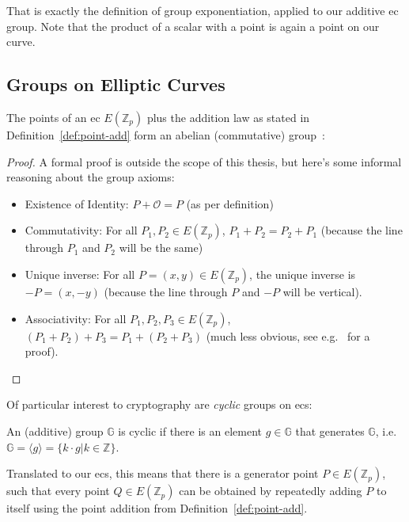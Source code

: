 That is exactly the definition of group exponentiation, applied to our additive \gls{ec} group. Note that the product of a scalar with a point is again a point on our curve.\\

\subsection{Groups on Elliptic Curves}
\begin{theorem}
    The points of an \gls{ec} $E(\mathbb{Z}_p)$ plus the addition law as stated in Definition~\ref{def:point-add} form an abelian (commutative) group~\cite{katz_introduction_2015, washington_elliptic_2008}:
\end{theorem}
\begin{proof}
    A formal proof is outside the scope of this thesis, but here's some informal reasoning about the group axioms:
    \begin{itemize}
        \item Existence of Identity: $P + \mathcal{O} = P$ (as per definition)
        \item Commutativity: For all $P_1, P_2 \in E(\mathbb{Z}_p)$, $P_1 + P_2 = P_2 + P_1$ (because the line through $P_1$ and $P_2$ will be the same)
        \item Unique inverse: For all $P = (x,y) \in E(\mathbb{Z}_p)$, the unique inverse is $-P = (x, -y)$ (because the line through $P$ and $-P$ will be vertical).
        \item Associativity: For all $P_1, P_2, P_3 \in E(\mathbb{Z}_p)$, $(P_1 + P_2) + P_3 = P_1 + (P_2 + P_3)$ (much less obvious, see e.g.~\cite[Chapter 2.4]{washington_elliptic_2008} for a proof).
    \end{itemize}
\end{proof}

Of particular interest to cryptography are \emph{cyclic} groups on \glspl{ec}:
\begin{definition}
    An (additive) group $\mathbb{G}$ is cyclic if there is an element $g \in \mathbb{G}$ that generates $\mathbb{G}$, i.e. $\mathbb{G} = \langle g \rangle = \{k \cdot g | k \in \mathbb{Z}\}$.
\end{definition}

Translated to our \glspl{ec}, this means that there is a generator point $P \in E(\mathbb{Z}_p)$, such that every point $Q \in E(\mathbb{Z}_p)$ can be obtained by repeatedly adding $P$ to itself using the point addition from Definition~\ref{def:point-add}.

